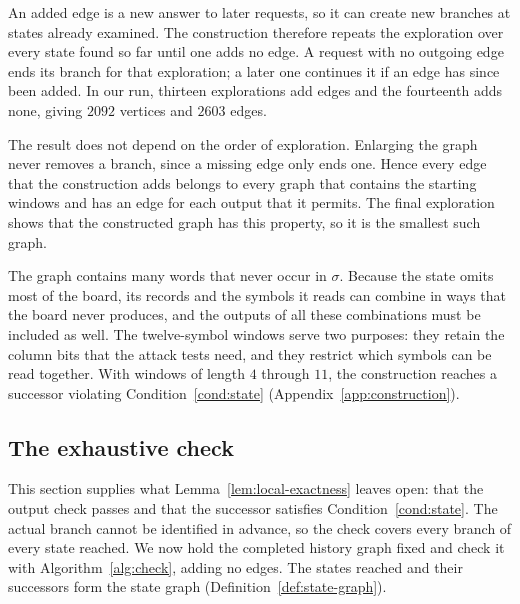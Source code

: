 An added edge is a new answer to later requests, so it can create
new branches at states already examined. The construction therefore
repeats the exploration over every state found so far until one adds
no edge. A request with no outgoing edge ends its branch for that
exploration; a later one continues it if an edge has since been
added. In our run, thirteen explorations
add edges and the fourteenth adds none, giving $2092$ vertices and
$2603$ edges.

The result does not depend on the order of exploration. Enlarging
the graph never removes a branch, since a missing edge only ends
one. Hence every edge that the construction adds belongs to every
graph that contains the starting windows and has an edge for each
output that it permits. The final exploration shows that the
constructed graph has this property, so it is the smallest such
graph.

The graph contains many words that never occur in $\sigma$. Because
the state omits most of the board, its records and the symbols it
reads can combine in ways that the board never produces, and the
outputs of all these combinations must be included as well. The
twelve-symbol windows serve two purposes: they retain the
column bits that the attack tests need, and they restrict which
symbols can be read together. With windows of length $4$ through
$11$, the construction reaches a successor violating
Condition~\ref{cond:state} (Appendix~\ref{app:construction}).

\newpage
\subsection{The exhaustive check}\label{sec:closure-check}

This section supplies what Lemma~\ref{lem:local-exactness} leaves open:
that the output check passes and that the successor satisfies
Condition~\ref{cond:state}. The actual branch cannot be identified in
advance, so the check covers every branch of every state reached.
We now hold the completed history graph fixed and check it with
Algorithm~\ref{alg:check}, adding no edges. The states reached and
their successors form the state graph (Definition~\ref{def:state-graph}).

